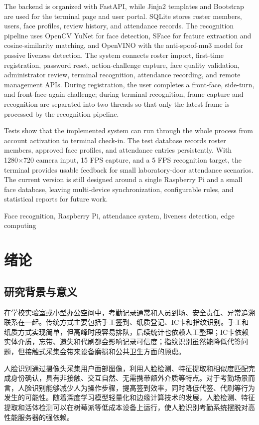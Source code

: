 \documentclass[UTF8]{heuthesis}
\begin{document}
The backend is organized with FastAPI, while Jinja2 templates and Bootstrap are used for the terminal page and user portal. SQLite stores roster members, users, face profiles, review history, and attendance records. The recognition pipeline uses OpenCV YuNet for face detection, SFace for feature extraction and cosine-similarity matching, and OpenVINO with the anti-spoof-mn3 model for passive liveness detection. The system connects roster import, first-time registration, password reset, action-challenge capture, face quality validation, administrator review, terminal recognition, attendance recording, and remote management APIs. During registration, the user completes a front-face, side-turn, and front-face-again challenge; during terminal recognition, frame capture and recognition are separated into two threads so that only the latest frame is processed by the recognition pipeline.

Tests show that the implemented system can run through the whole process from account activation to terminal check-in. The test database records roster members, approved face profiles, and attendance entries persistently. With 1280×720 camera input, 15 FPS capture, and a 5 FPS recognition target, the terminal provides usable feedback for small laboratory-door attendance scenarios. The current version is still designed around a single Raspberry Pi and a small face database, leaving multi-device synchronization, configurable rules, and statistical reports for future work.


\par{} Face recognition, Raspberry Pi, attendance system, liveness detection, edge computing
\clearpage
\tableofcontents
\clearpage
\mainmatter
\chapter{绪论}
\section{研究背景与意义}
在学校实验室或小型办公空间中，考勤记录通常和人员到场、安全责任、异常追溯联系在一起。传统方式主要包括手工签到、纸质登记、IC卡和指纹识别。手工和纸质方式实现简单，但高峰时段容易排队，后续统计也依赖人工整理；IC卡依赖实体介质，忘带、遗失和代刷都会影响记录可信度；指纹识别虽然能降低代签问题，但接触式采集会带来设备磨损和公共卫生方面的顾虑。

人脸识别通过摄像头采集用户面部图像，利用人脸检测、特征提取和相似度匹配完成身份确认，具有非接触、交互自然、无需携带额外介质等特点。对于考勤场景而言，人脸识别能够减少人为操作步骤，提高签到效率，同时降低代签、代刷等行为发生的可能性。随着深度学习模型轻量化和边缘计算技术的发展，人脸检测、特征提取和活体检测可以在树莓派等低成本设备上运行，使人脸识别考勤系统摆脱对高性能服务器的强依赖。
\end{document}
